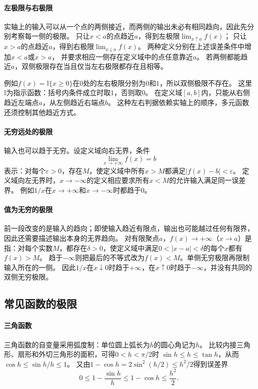 \paragraph{左极限与右极限}
实轴上的输入可以从一个点的两侧接近，而两侧的输出未必有相同趋向，因此先分别考察每一侧的极限。
只让$x<a$的点趋近$a$，得到左极限$\lim_{x\uparrow a}f(x)$；
只让$x>a$的点趋近$a$，得到右极限$\lim_{x\downarrow a}f(x)$。
两种定义分别在上述误差条件中增加$x<a$或$x>a$，
并要求相应一侧存在定义域中的点任意靠近$a$。
若两侧都能趋近$a$，双侧极限存在当且仅当左右极限都存在且相等。

例如$f(x)=\mathbb I\{x\geq0\}$在$0$处的左右极限分别为$0$和$1$，所以双侧极限不存在。
这里$\mathbb I$为指示函数：括号内条件成立时取$1$，否则取$0$。
在定义域$[a,b]$内，只能从右侧趋近左端点$a$，从左侧趋近右端点$b$。
这种左右判据依赖实轴上的顺序，多元函数还须控制其他趋近方式。

\paragraph{无穷远处的极限}
输入也可以趋于无穷。设定义域向右无界，条件
\[
 \lim_{x\to+\infty}f(x)=b
\]
表示：对每个$\varepsilon>0$，存在$M$，使定义域中所有$x>M$都满足$|f(x)-b|<\varepsilon$。
定义域向左无界时，$x\to-\infty$的定义相应要求所有$x<M$的允许输入满足同一误差界。
例如$1/x$在$x\to+\infty$和$x\to-\infty$时都趋于$0$。

\paragraph{值为无穷的极限}
前一段改变的是输入的趋向；即使输入趋近有限点，输出也可能越过任何有限界，因此还需要描述输出本身的无界趋向。
对有限聚点$a$，$f(x)\to+\infty$（$x\to a$）是指：对每个实数$M$，都存在$\delta>0$，使定义域中满足$0<|x-a|<\delta$的每个$x$都有$f(x)>M$。
趋于$-\infty$则把最后的不等式改为$f(x)<M$。单侧无穷极限再限制输入所在的一侧。
因此$1/x$在$x\downarrow0$时趋于$+\infty$，在$x\uparrow0$时趋于$-\infty$，并没有共同的双侧无穷极限。

\subsection{常见函数的极限}

\paragraph{三角函数}
三角函数的自变量采用弧度制：单位圆上弧长为$h$的圆心角记为$h$。
比较内接三角形、扇形和外切三角形的面积，可得$0<h<\pi/2$时
$\sin h\leq h\leq\tan h$，从而$\cos h\leq\sin h/h\leq1$。
又由$1-\cos h=2\sin^2(h/2)\leq h^2/2$得到误差界
\[
 0\leq1-\frac{\sin h}{h}\leq1-\cos h\leq\frac{h^2}{2}.
\]

